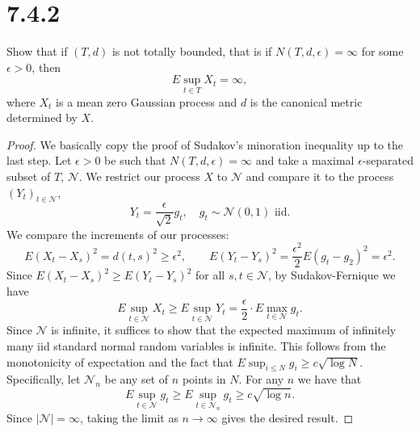 \documentclass[11pt,letterpaper]{report}
\newcommand{\mcal}[1]{\mathcal{#1}}
\begin{document}
\section*{7.4.2}
Show that if $(T, d)$ is not totally bounded, that is if $N(T, d, \epsilon)=\infty$ for some $\epsilon>0$, then
\[
E \sup_{t\in T}X_t = \infty,
\]
where $X_t$ is a mean zero Gaussian process and $d$ is the canonical metric determined by $X$.
\begin{proof}
	We basically copy the proof of Sudakov's minoration inequality up to the last step. Let $\epsilon>0$ be such that $N(T, d, \epsilon) = \infty$ and take a maximal $\epsilon$-separated subset of $T$, $\mcal{N}$. We restrict our process $X$ to $\mcal{N}$ and compare it to the process $(Y_t)_{t\in \mcal{N}}$,
	\[
	Y_t = \frac{\epsilon}{\sqrt{2}}g_t,\quad g_t\sim \mcal{N}(0, 1)\text{ iid.}
	\]
	We compare the increments of our processes:
	\[
	E(X_t - X_s)^2 = d(t, s)^2 \geq \epsilon^2,\qquad E(Y_t-Y_s)^2 = \frac{\epsilon^2}{2}E(g_t-g_2)^2= \epsilon^2.
	\]
	Since $E(X_t-X_s)^2 \geq E(Y_t-Y_s)^2$ for all $s,t\in \mcal{N}$, by Sudakov-Fernique we have
	\[
	E\sup_{t\in \mcal{N}}X_t \geq E\sup_{t\in \mcal{N}}Y_t = \frac{\epsilon}{2}\cdot E\max_{t\in \mcal{N}}g_t.
	\]
	Since $\mcal{N}$ is infinite, it suffices to show that the expected maximum of infinitely many iid standard normal random variables is infinite. This follows from the monotonicity of expectation and the fact that $E\sup_{i\leq N}g_i \geq c\sqrt{\log N}$. Specifically, let $\mcal{N}_n$ be any set of $n$ points in $N$. For any $n$ we have that
	\[
		E\sup_{t\in \mcal{N}}g_t \geq E\sup_{t\in \mcal{N}_n}g_t \geq c\sqrt{\log n}.
	\]
	Since $|\mcal{N}| = \infty$, taking the limit as $n\to \infty$ gives the desired result.
\end{proof}
\end{document}
